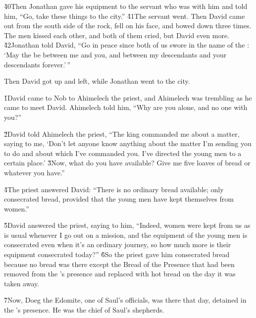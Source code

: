 \v{40}Then Jonathan gave his equipment to the servant who was with him and told him, ``Go, take these things to the city.'' \v{41}The servant went. Then David came out from the south side of the rock, fell on his face, and bowed down three times. The men kissed each other, and both of them cried, but David even more. \v{42}Jonathan told David, ``Go in peace since both of us swore in the name of the : `May the  be between me and you, and between my descendants and your descendants forever.'\,''

Then David got up and left, while Jonathan went to the city.

\v{1}David came to Nob to Ahimelech the priest, and Ahimelech was trembling as he came to meet David. Ahimelech told him, ``Why are you alone, and no one with you?''

\v{2}David told Ahimelech the priest, ``The king commanded me about a matter, saying to me, `Don't let anyone know anything about the matter I'm sending you to do and about which I've commanded you. I've directed the young men to a certain place.' \v{3}Now, what do you have available? Give me five loaves of bread or whatever you have.''

\v{4}The priest answered David: ``There is no ordinary bread available; only consecrated bread, provided that the young men have kept themselves from women.''

\v{5}David answered the priest, saying to him, ``Indeed, women were kept from us as is usual whenever I go out on a mission, and the equipment of the young men is consecrated even when it's an ordinary journey, so how much more is their equipment consecrated today?'' \v{6}So the priest gave him consecrated bread because no bread was there except the Bread of the Presence that had been removed from the 's presence and replaced with hot bread on the day it was taken away.

\v{7}Now, Doeg the Edomite, one of Saul's officials, was there that day, detained in the 's presence. He was the chief of Saul's shepherds.

